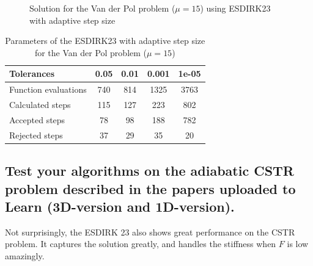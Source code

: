 \begin{figure}[H]
    \centering
    \caption{Solution for the Van der Pol problem ($\mathit{\mu = 15}$) using ESDIRK23 with adaptive step size}
    \label{8_4_mu_15}
\end{figure}

\begin{table}[H]
    \centering
    \begin{tabular}{@{}l|cccc@{}}
    \toprule
    Tolerances           & 0.05 & 0.01 & 0.001 & 1e-05 \\ \midrule
    Function evaluations & 740  & 814  & 1325  & 3763  \\
    Calculated steps     & 115  & 127  & 223   & 802   \\
    Accepted steps       & 78   & 98   & 188   & 782   \\
    Rejected steps       & 37   & 29   & 35    & 20    \\ \bottomrule
    \end{tabular}
    \caption{Parameters of the ESDIRK23 with adaptive step size for the Van der Pol problem ($\mathit{\mu = 15}$)}
    \label{8_4_adaptive_mu_15_table}
\end{table}


\subsection{Test  your  algorithms  on  the  adiabatic  CSTR  problem  described  in  the papers uploaded to Learn (3D-version and 1D-version).}
Not surprisingly, the ESDIRK 23 also shows great performance on the CSTR problem. It captures the solution greatly, and handles the stiffness when $F$ is low amazingly.

